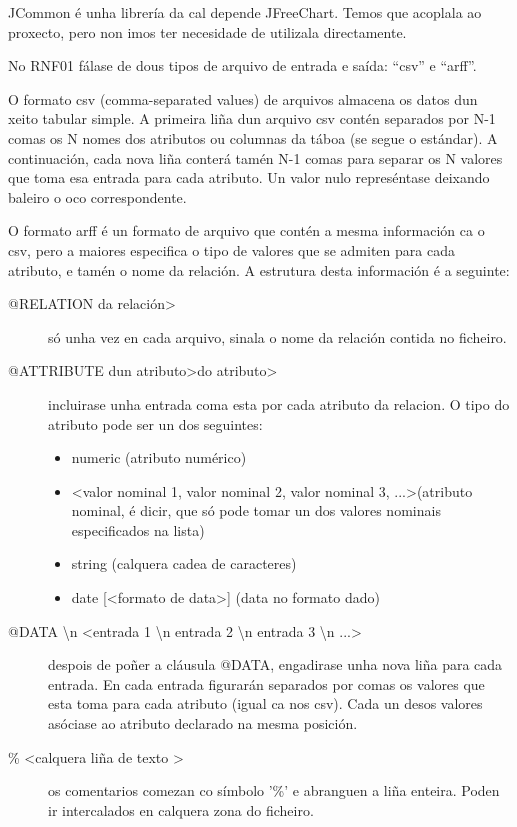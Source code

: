 JCommon é unha librería da cal depende JFreeChart. Temos que acoplala ao proxecto, pero non imos ter necesidade de utilizala directamente.


No RNF01 fálase de dous tipos de arquivo de entrada e saída: ``csv'' e ``arff''.

O formato csv (comma-separated values) de arquivos almacena os datos dun xeito tabular simple. A primeira liña dun arquivo csv contén separados por N-1 comas os N nomes dos atributos ou columnas da táboa (se segue o estándar). A continuación, cada nova liña conterá tamén N-1 comas para separar os N valores que toma esa entrada para cada atributo. Un valor nulo represéntase deixando baleiro o oco correspondente.

O formato arff  é un formato de arquivo que contén a mesma información ca o csv, pero a maiores especifica o tipo de valores que se admiten para cada atributo, e tamén o nome da relación. A estrutura desta información é a seguinte:

\begin{description}
\item[@RELATION \textlessnome da relación\textgreater] só unha vez en cada arquivo, sinala o nome da relación contida no ficheiro.
\item[@ATTRIBUTE \textlessnome dun atributo\textgreater \textlesstipo do atributo\textgreater] incluirase unha entrada coma esta por cada atributo da relacion. O tipo do atributo pode ser un dos seguintes:
\begin{itemize}
\item numeric (atributo numérico)
\item \textless valor nominal 1, valor nominal 2, valor nominal 3, ...\textgreater (atributo nominal, é dicir, que só pode tomar un dos valores nominais especificados na lista)
\item string (calquera cadea de caracteres)
\item date [\textless formato de data\textgreater ] (data no formato dado)
\end{itemize} 
\item[@DATA \textbackslash n \textless entrada 1 \textbackslash n entrada 2 \textbackslash n entrada 3 \textbackslash n ...\textgreater] despois de poñer a cláusula @DATA, engadirase unha nova liña para cada entrada. En cada entrada figurarán separados por comas os valores que esta toma para cada atributo (igual ca nos csv). Cada un desos valores asóciase ao atributo declarado na mesma posición.
\item[\% \textless calquera liña de texto \textgreater] os comentarios comezan co símbolo '\%' e abranguen a liña enteira. Poden ir intercalados en calquera zona do ficheiro.
\end{description} 

